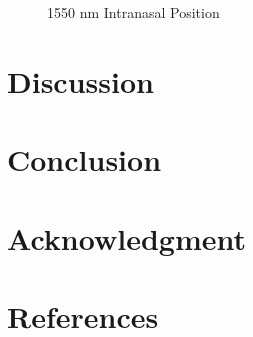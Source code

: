 \documentclass[journal,twoside,web]{ieeecolor}
\begin{document}
\begin{figure}[!htb]
    \caption{\label{fig:1550-Intra} 1550 nm Intranasal Position}
\end{figure}

\section{Discussion}
\label{sec:next steps}

\section{Conclusion}
\label{sec:conclusion}

\section*{Acknowledgment}

\section*{References}
\end{document}
